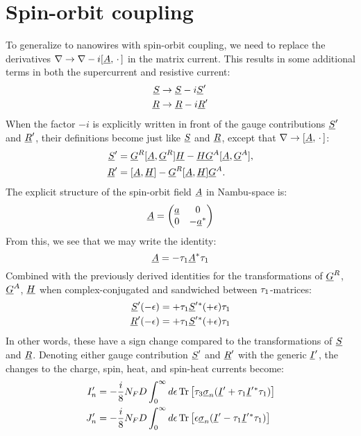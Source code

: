 \clearpage
\section{Spin-orbit coupling}
To generalize to nanowires with spin-orbit coupling, we need to replace the derivatives $\nabla \rightarrow \nabla - i[\underline{A}, \,\cdot\,]$ in the matrix current.
This results in some additional terms in both the supercurrent and resistive current:
\begin{align}
  \underline{S} &\rightarrow \underline{S} - i\underline{S}' \\
  \underline{R} &\rightarrow \underline{R} - i\underline{R}'
\end{align}
When the factor $-i$ is explicitly written in front of the gauge contributions $\underline{S}'$ and $\underline{R}'$, their definitions become just like $\underline{S}$ and $\underline{R}$, except that $\nabla \rightarrow [\underline{A}, \,\cdot\,]$:
\begin{align}
  \underline{S}' &= \underline{G}^R [\underline{A}, \underline{G}^R] \underline{H} - \underline{H} \underline{G}^A [\underline{A}, \underline{G}^A],  \\
  \underline{R}' &= [\underline{A}, \underline{H}] - \underline{G}^R [\underline{A}, \underline{H}] \underline{G}^A.
\end{align}
The explicit structure of the spin-orbit field $\underline{A}$ in Nambu-space is:
\begin{equation}
  \underline{A} = 
  \begin{pmatrix}
    \underline{a} & 0 \\
    0 & -\underline{a}^*
  \end{pmatrix}
\end{equation}
From this, we see that we may write the identity:
\begin{equation}
  \underline{A} = -\tau_{1}\underline{A}^*\tau_{1}
\end{equation}
Combined with the previously derived identities for the transformations of $\underline{G}^R$, $\underline{G}^A$, $\underline{H}$ when complex-conjugated and sandwiched between $\tau_{1}$-matrices:
\begin{align}
  \underline{S}'(-\epsilon) &= +\tau_{1}\underline{S}'{}^*(+\epsilon)\tau_{1} \\
  \underline{R}'(-\epsilon) &= +\tau_{1}\underline{S}'{}^*(+\epsilon)\tau_{1}
\end{align}
In other words, these have a sign change compared to the transformations of $\underline{S}$ and $\underline{R}$.
Denoting either gauge contribution $\underline{S}'$ and $\underline{R}'$ with the generic $\underline{I}'$, the changes to the charge, spin, heat, and spin-heat currents become:
\begin{align}
  I_n' &= -\frac{i}{8}N_F D \int_{0}^{\infty} d\epsilon \operatorname{Tr}\big[ \tau_{3} \underline{\sigma}_{n} (\underline{I}' + \tau_{1}\underline{I}'{}^*\tau_{1}) \big]\\
  J_n' &= -\frac{i}{8}N_F D \int_{0}^{\infty} d\epsilon \operatorname{Tr}\big[ \epsilon \underline{\sigma}_{n} (\underline{I}' - \tau_{1}\underline{I}'{}^*\tau_{1}) \big]
\end{align}
